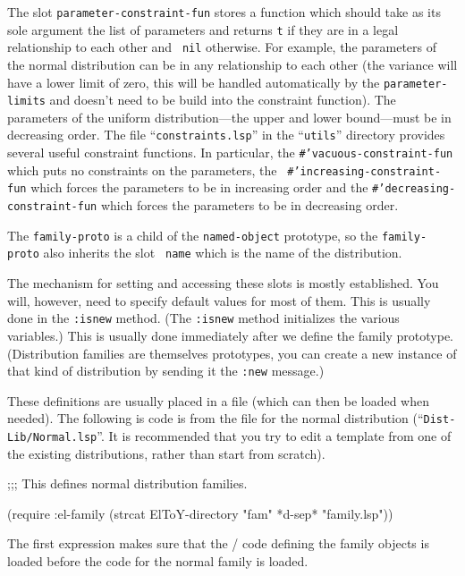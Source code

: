 The slot {\tt parameter-constraint-fun\/} stores a function which
should take as its sole argument the list of parameters and returns
{\tt t\/} if they are in a legal relationship to each other and {\tt
nil\/} otherwise.  For example, the parameters of the normal
distribution can be in any relationship to each other (the variance
will have a lower limit of zero, this will be handled automatically by
the {\tt parameter-limits\/} and doesn't need to be build into the
constraint function).  The parameters of the uniform
distribution---the upper and lower bound---must be in decreasing
order.  The file ``{\tt constraints.lsp\/}'' in the ``{\tt utils\/}''
directory provides several useful constraint functions.  In
particular, the {\tt \#'vacuous-constraint-fun\/} which puts no
constraints on the parameters, the {\tt
\#'increasing-constraint-fun\/} which forces the parameters to be in
increasing order and the {\tt \#'decreasing-constraint-fun\/} which
forces the parameters to be in decreasing order.

The {\tt family-proto\/} is a child of the {\tt named-object\/}
prototype, so the {\tt family-proto\/} also inherits the slot {\tt
name\/} which is the name of the distribution.  

\medskip

The mechanism for setting and accessing these slots is mostly
established.  You will, however, need to specify default values for
most of them.  This is usually done in the {\tt :isnew\/} method.
(The {\tt :isnew\/} method initializes the various variables.)  This is
usually done immediately after we define the family prototype.
(Distribution families are themselves prototypes, you can create a new
instance of that kind of distribution by sending it the {\tt :new\/}
message.) 

These definitions are usually placed in a file (which can then be
loaded when needed).  The following is code is from the file for the
normal distribution (``{\tt Dist-Lib/Normal.lsp\/}''.  It is
recommended that you try to edit a template from one of the existing
distributions, rather than start from scratch).

\begincode
;;; This defines normal distribution families.

(require :el-family (strcat ElToY-directory "fam" *d-sep*  "family.lsp"))
\endcode

The first expression makes sure that the \eltoy/ code defining the
family objects is loaded before the code for the normal family is
loaded.  

